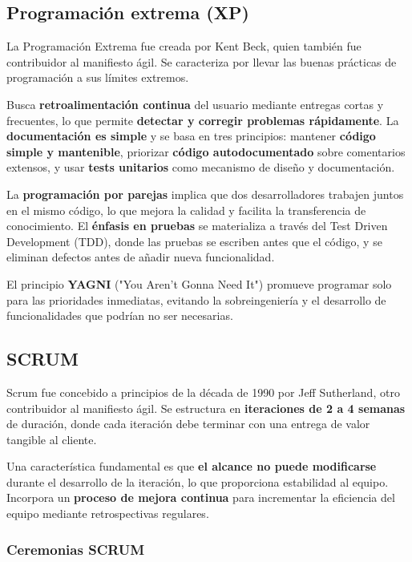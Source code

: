 \documentclass[a4paper,11pt]{report}
\begin{document}
\subsection{Programación extrema (XP)}

La Programación Extrema fue creada por Kent Beck, quien también fue contribuidor al manifiesto ágil. Se caracteriza por llevar las buenas prácticas de programación a sus límites extremos.

Busca \textbf{retroalimentación continua} del usuario mediante entregas cortas y frecuentes, lo que permite \textbf{detectar y corregir problemas rápidamente}. La \textbf{documentación es simple} y se basa en tres principios: mantener \textbf{código simple y mantenible}, priorizar \textbf{código autodocumentado} sobre comentarios extensos, y usar\textbf{ tests unitarios }como mecanismo de diseño y documentación.

La \textbf{programación por parejas} implica que dos desarrolladores trabajen juntos en el mismo código, lo que mejora la calidad y facilita la transferencia de conocimiento. El \textbf{énfasis en pruebas} se materializa a través del Test Driven Development (TDD), donde las pruebas se escriben antes que el código, y se eliminan defectos antes de añadir nueva funcionalidad.

El principio \textbf{YAGNI} ("You Aren't Gonna Need It") promueve programar solo para las prioridades inmediatas, evitando la sobreingeniería y el desarrollo de funcionalidades que podrían no ser necesarias.


\subsection{SCRUM}

Scrum fue concebido a principios de la década de 1990 por Jeff Sutherland, otro contribuidor al manifiesto ágil. Se estructura en \textbf{iteraciones de 2 a 4 semanas} de duración, donde cada iteración debe terminar con una entrega de valor tangible al cliente.

Una característica fundamental es que \textbf{el alcance no puede modificarse} durante el desarrollo de la iteración, lo que proporciona estabilidad al equipo. Incorpora un \textbf{proceso de mejora continua} para incrementar la eficiencia del equipo mediante retrospectivas regulares.


\subsubsection{Ceremonias SCRUM}
\end{document}
